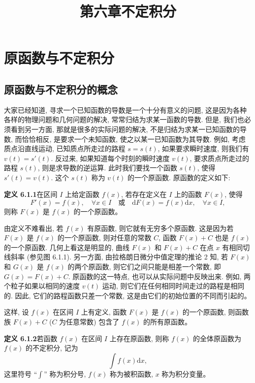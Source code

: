 \documentclass[UTF8,12pt,a4paper,fontset=fandol]{ctexart}
\title{第六章\quad 不定积分}
\author{}
\date{}
\begin{document}
\maketitle

\section{原函数与不定积分}

\subsection{原函数与不定积分的概念}

大家已经知道, 寻求一个已知函数的导数是一个十分有意义的问题, 这是因为各种各样的物理问题和几何问题的解决, 常常归结为求某一函数的导数. 但是, 我们也必须看到另一方面, 那就是很多的实际问题的解决, 不是归结为求某一已知函数的导数, 而恰恰相反, 是要求一个未知函数, 使之以某一已知函数为其导数. 例如, 考虑质点沿直线运动, 已知质点所走过的路程 $s=s(t)$, 如果要求瞬时速度, 则我们有 $v(t)=s'(t)$. 反过来, 如果知道每个时刻的瞬时速度 $v(t)$, 要求质点所走过的路程 $s(t)$, 则是求导数的逆运算. 此时我们要找一个函数 $s(t)$, 使得 $s'(t)=v(t)$. 这个 $s(t)$ 称为 $v(t)$ 的一个原函数. 原函数的定义如下:

\noindent\textbf{定义 6.1.1}\quad 在区间 $I$ 上给定函数 $f(x)$, 若存在定义在 $I$ 上的函数 $F(x)$, 使得
\[
  F'(x)=f(x),\quad \forall x\in I
  \quad\text{或}\quad
  \mathrm dF(x)=f(x)\mathrm dx,\quad \forall x\in I,
\]
则称 $F(x)$ 是 $f(x)$ 的一个原函数。

由定义不难看出, 若 $f(x)$ 有原函数, 则它就有无穷多个原函数. 这是因为若 $F(x)$ 是 $f(x)$ 的一个原函数, 则对任意的常数 $C$, 函数 $F(x)+C$ 也是 $f(x)$ 的一个原函数. 几何上看这是明显的, 曲线 $F(x)$ 和 $F(x)+C$ 在点 $x$ 有相同切线斜率 (参见图 6.1.1). 另一方面, 由拉格朗日微分中值定理的推论 2 知, 若 $F(x)$ 和 $G(x)$ 是 $f(x)$ 的两个原函数, 则它们之间只能是相差一个常数, 即 $G(x)=F(x)+C$. 原函数的这一特点, 也可以从实际问题中反映出来. 例如, 两个粒子如果以相同的速度 $v(t)$ 运动, 则它们在任何相同时间走过的路程是相同的. 因此, 它们的路程函数只差一个常数, 这是由它们的初始位置的不同而引起的。

这样, 设 $f(x)$ 在区间 $I$ 上有定义, 函数 $F(x)$ 是 $f(x)$ 的一个原函数, 则函数族 $F(x)+C$ ($C$ 为任意常数) 包含了 $f(x)$ 的所有原函数。

\noindent\textbf{定义 6.1.2}\quad 若函数 $f(x)$ 在区间 $I$ 上存在原函数, 则称 $f(x)$ 的全体原函数为 $f(x)$ 的不定积分, 记为
\[
  \int f(x)\mathrm dx,
\]
这里符号 ``$\int$'' 称为积分号, $f(x)$ 称为被积函数, $x$ 称为积分变量。
\end{document}
